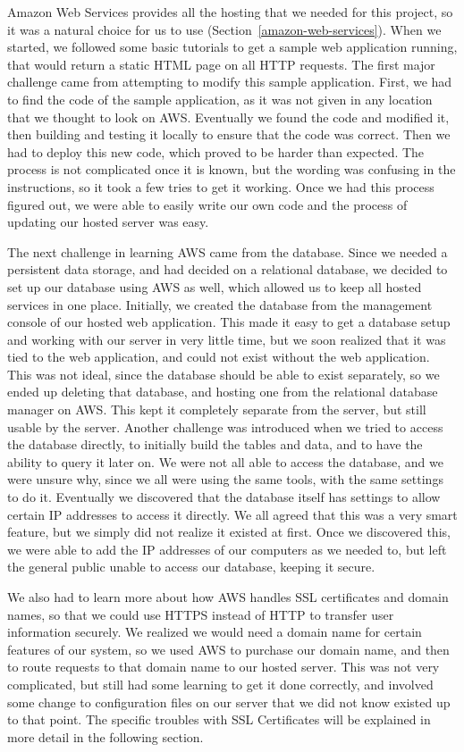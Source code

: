 \documentclass[12pt]{report}
\begin{document}
Amazon Web Services provides all the hosting that we needed for this project, so it was a
natural choice for us to use (Section~\ref{amazon-web-services}). When we started, we followed
some basic tutorials to get a sample
web application running, that would return a static HTML page on all HTTP requests. The first
major challenge came from attempting to modify this sample application. First, we had to find
the code of the sample application, as it was not given in any location that we thought to look on
AWS. Eventually we found the code and modified it, then building and testing it locally to
ensure that the code was correct. Then we had to deploy this new code, which proved to be
harder than expected. The process is not complicated once it is known, but the wording was
confusing in the instructions, so it took a few tries to get it working. Once we had this process
figured out, we were able to easily write our own code and the process of updating our hosted
server was easy.

The next challenge in learning AWS came from the database. Since we needed a
persistent data storage, and had decided on a relational database, we decided to set up our
database using AWS as well, which allowed us to keep all hosted services in one place. Initially,
we created the database from the management console of our hosted web application. This made
it easy to get a database setup and working with our server in very little time, but we soon
realized that it was tied to the web application, and could not exist without the web application.
This was not ideal, since the database should be able to exist separately, so we ended up deleting
that database, and hosting one from the relational database manager on AWS. This kept it
completely separate from the server, but still usable by the server. Another challenge was
introduced when we tried to access the database directly, to initially build the tables and data,
and to have the ability to query it later on. We were not all able to access the database, and we
were unsure why, since we all were using the same tools, with the same settings to do it.
Eventually we discovered that the database itself has settings to allow certain IP addresses to
access it directly. We all agreed that this was a very smart feature, but we simply did not realize
it existed at first. Once we discovered this, we were able to add the IP addresses of our
computers as we needed to, but left the general public unable to access our database, keeping it
secure.

We also had to learn more about how AWS handles SSL certificates and domain names,
so that we could use HTTPS instead of HTTP to transfer user information securely. We realized
we would need a domain name for certain features of our system, so we used AWS to purchase
our domain name, and then to route requests to that domain name to our hosted server. This was
not very complicated, but still had some learning to get it done correctly, and involved some
change to configuration files on our server that we did not know existed up to that point. The
specific troubles with SSL Certificates will be explained in more detail in the following section.
\end{document}
